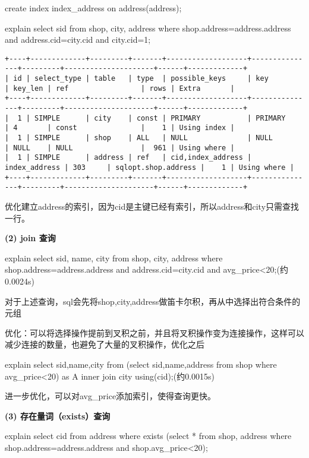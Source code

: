 \documentclass[a4paper, 11pt, nofonts, nocap, fancyhdr]{ctexart}
\begin{document}
create index index\_address on address(address);

explain select sid from shop, city, address where shop.address=address.address and address.cid=city.cid and city.cid=1;

\begin{verbatim}
+----+-------------+---------+-------+-------------------+---------------+---------+---------------------+------+-------------+
| id | select_type | table   | type  | possible_keys     | key           | key_len | ref                 | rows | Extra       |
+----+-------------+---------+-------+-------------------+---------------+---------+---------------------+------+-------------+
|  1 | SIMPLE      | city    | const | PRIMARY           | PRIMARY       | 4       | const               |    1 | Using index |
|  1 | SIMPLE      | shop    | ALL   | NULL              | NULL          | NULL    | NULL                |  961 | Using where |
|  1 | SIMPLE      | address | ref   | cid,index_address | index_address | 303     | sqlopt.shop.address |    1 | Using where |
+----+-------------+---------+-------+-------------------+---------------+---------+---------------------+------+-------------+
\end{verbatim}

优化建立address的索引，因为cid是主键已经有索引，所以address和city只需查找一行。

\vspace{0.7cm}

\textbf{(2) join 查询} 

explain select sid, name, city from shop, city, address where shop.address=address.address and address.cid=city.cid and avg\_price<20;(约0.0024s)

对于上述查询，sql会先将shop,city,address做笛卡尔积，再从中选择出符合条件的元组

优化：可以将选择操作提前到叉积之前，并且将叉积操作变为连接操作，这样可以减少连接的数量，也避免了大量的叉积操作，优化之后

explain select sid,name,city from (select sid,name,address from shop where avg\_price<20) as A inner join city using(cid);(约0.0015s)

进一步优化，可以对avg\_price添加索引，使得查询更快。

\vspace{0.7cm}

\textbf{(3) 存在量词（exists）查询} 

explain select cid from address where exists (select * from shop, address where shop.address=address.address and shop.avg\_price<20);
\end{document}
